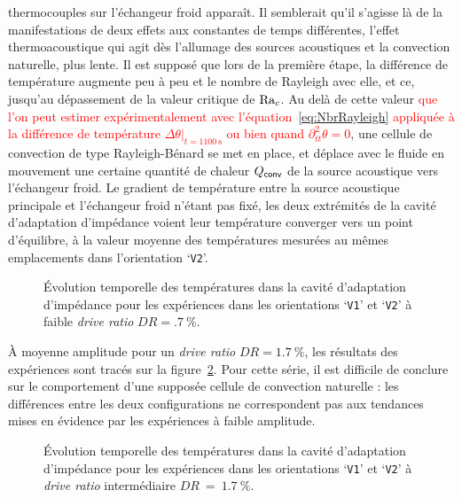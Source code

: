 thermocouples sur l'échangeur froid apparaît. Il semblerait qu'il s'agisse là de la manifestations de deux effets aux constantes de temps différentes, l'effet thermoacoustique qui agit dès l'allumage des sources acoustiques et la convection naturelle, plus lente. Il est supposé que lors de la première étape, la différence de température augmente peu à peu et le nombre de Rayleigh avec elle, et ce, jusqu'au dépassement de la valeur critique de $\mathrm{Ra}_c$. Au delà de cette valeur \textcolor{red}{que l'on peut estimer expérimentalement avec l'équation~\eqref{eq:NbrRayleigh} appliquée à la différence de température $\Delta \theta|_{t=\qty{1100}{\second}}$ ou bien quand $\partial^2_{tt}\theta=\num{0}$}, une cellule de convection de type Rayleigh-Bénard se met en place, et déplace avec le fluide en mouvement une certaine quantité de chaleur $Q_{\sf conv}$ de la source acoustique vers l'échangeur froid. Le gradient de température entre la source acoustique principale et l'échangeur froid n'étant pas fixé, les deux extrémités de la cavité d'adaptation d'impédance voient leur température converger vers un point d'équilibre, à la valeur moyenne des températures mesurées au mêmes emplacements dans l'orientation `\texttt{V2}'.
\smallskip
 
\begin{figure}[!ht]
    \centering
    
    \caption{\'Evolution temporelle des températures dans la cavité d'adaptation d'impédance pour les expériences dans les orientations `\texttt{V1}' et `\texttt{V2}' à faible \textit{drive ratio} $DR=\qty{.7}{\percent}$.}
    \label{fig:Acou_CHXout_V1V2_Low}
\end{figure}

À moyenne amplitude pour un \textit{drive ratio} $DR=\qty{1.7}{\percent}$, les résultats des expériences sont tracés sur la figure~\ref{fig:Acou_CHXout_V1V2_Mid}. Pour cette série, il est difficile de conclure sur le comportement d'une supposée cellule de convection naturelle : les différences entre les deux configurations ne correspondent pas aux tendances mises en évidence par les expériences à faible amplitude.
\smallskip

\begin{figure}[!ht]
    \centering
    
    \caption{\'Evolution temporelle des températures dans la cavité d'adaptation d'impédance pour les expériences dans les orientations `\texttt{V1}' et `\texttt{V2}' à \textit{drive ratio} intermédiaire $DR~=~\qty{1.7}{\percent}$.}
    \label{fig:Acou_CHXout_V1V2_Mid}
\end{figure}

